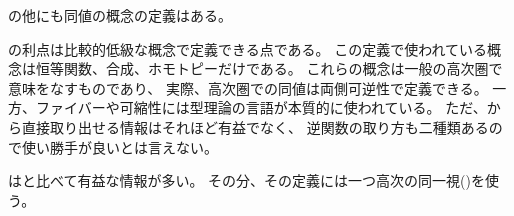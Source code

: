 \documentclass[index]{subfiles}
\begin{document}

の他にも同値の概念の定義はある。




の利点は比較的低級な概念で定義できる点である。
この定義で使われている概念は恒等関数、合成、ホモトピーだけである。
これらの概念は一般の高次圏で意味をなすものであり、
実際、高次圏での同値は両側可逆性で定義できる。
一方、ファイバーや可縮性には型理論の言語が本質的に使われている。
ただ、から直接取り出せる情報はそれほど有益でなく、
逆関数の取り方も二種類あるので使い勝手が良いとは言えない。




はと比べて有益な情報が多い。
その分、その定義には一つ高次の同一視(\myInlineMath{\myIsHAECoh})を使う。



\end{document}
